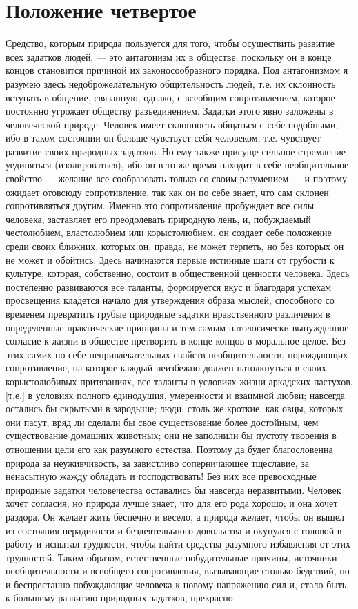 \documentclass[a4paper]{book}
\begin{document}
\section{Положение четвертое}

Средство, которым природа пользуется для того, чтобы осуществить развитие всех задатков людей, — это антагонизм их в обществе, поскольку он в конце концов становится причиной их законосообразного порядка. Под антагонизмом я разумею здесь недоброжелательную общительность людей, т.е. их склонность вступать в общение, связанную, однако, с всеобщим сопротивлением, которое постоянно угрожает обществу разъединением. Задатки этого явно заложены в человеческой природе. Человек имеет склонность общаться с себе подобными, ибо в таком состоянии он больше чувствует себя человеком, т.е. чувствует развитие своих природных задатков. Но ему также присуще сильное стремление уединяться (изолироваться), ибо он в то же время находит в себе необщительное свойство — желание все сообразовать только со своим разумением — и поэтому ожидает отовсюду сопротивление, так как он по себе знает, что сам склонен сопротивляться другим. Именно это сопротивление пробуждает все силы человека, заставляет его преодолевать природную лень, и, побуждаемый честолюбием, властолюбием или корыстолюбием, он создает себе положение среди своих ближних, которых он, правда, не может терпеть, но без которых он не может и обойтись. Здесь начинаются первые истинные шаги от грубости к культуре, которая, собственно, состоит в общественной ценности человека. Здесь постепенно развиваются все таланты, формируется вкус и благодаря успехам просвещения кладется начало для утверждения образа мыслей, способного со временем превратить грубые природные задатки нравственного различения в определенные практические принципы и тем самым патологически вынужденное согласие к жизни в обществе претворить в конце концов в моральное целое. Без этих самих по себе непривлекательных свойств необщительности, порождающих сопротивление, на которое каждый неизбежно должен натолкнуться в своих корыстолюбивых притязаниях, все таланты в условиях жизни аркадских пастухов, [т.е.] в условиях полного единодушия, умеренности и взаимной любви; навсегда остались бы скрытыми в зародыше; люди, столь же кроткие, как овцы, которых они пасут, вряд ли сделали бы свое существование более достойным, чем существование домашних животных; они не заполнили бы пустоту творения в отношении цели его как разумного естества. Поэтому да будет благословенна природа за неуживчивость, за завистливо соперничающее тщеславие, за ненасытную жажду обладать и господствовать! Без них все превосходные природные задатки человечества оставались бы навсегда неразвитыми. Человек хочет согласия, но природа лучше знает, что для его рода хорошо; и она хочет раздора. Он желает жить беспечно и весело, а природа желает, чтобы он вышел из состояния нерадивости и бездеятелььного довольства и окунулся с головой в работу и испытал трудности, чтобы найти средства разумного избавления от этих трудностей. Таким образом, естественные побудительные причины, источники необщительности и всеобщего сопротивления, вызывающие столько бедствий, но и беспрестанно побуждающие человека к новому напряжению сил и, стало быть, к большему развитию природных задатков, прекрасно 
\end{document}
